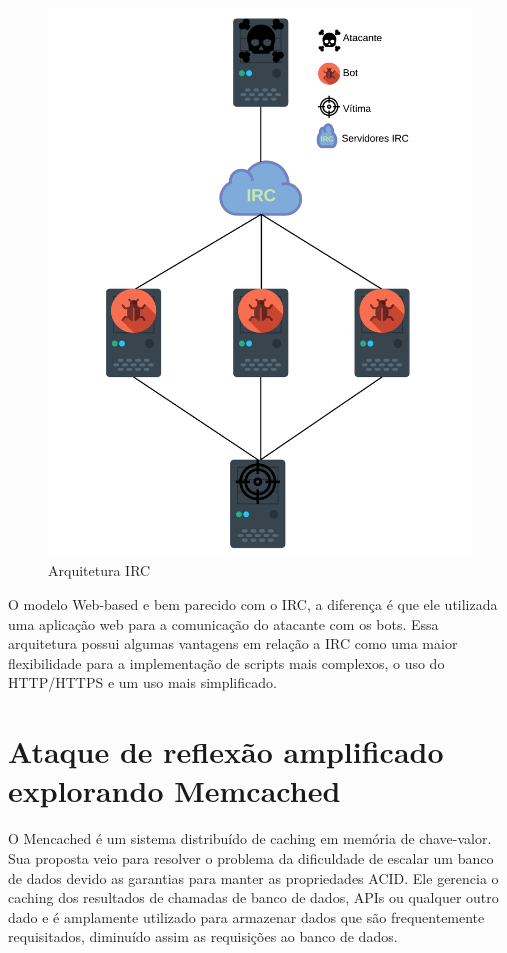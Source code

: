 \begin{figure}[H]
     \centering
     \includegraphics[scale=0.5]{img/DDoS_IRC.pdf}
     \caption{Arquitetura IRC }
     \label{img:DDoS_Architecture_IRC}
\end{figure}

O modelo Web-based e bem parecido com o IRC, a diferença é que ele utilizada uma aplicação web para a comunicação do atacante com os bots. Essa arquitetura possui algumas vantagens em relação a IRC como uma maior flexibilidade para a implementação de scripts mais complexos, o uso do HTTP/HTTPS e um uso mais simplificado.

\section{Ataque de reflexão amplificado explorando Memcached} \label{sec:2.Ataque de reflexão amplificado explorando Memcached}

O Mencached é um sistema distribuído de caching em memória de chave-valor. Sua proposta veio para resolver o problema da dificuldade de escalar um banco de dados devido as garantias para manter as propriedades \acrfull{ACID}. Ele gerencia o caching dos resultados de chamadas de banco de dados, APIs ou qualquer outro dado e é amplamente utilizado para armazenar dados que são frequentemente requisitados, diminuído assim as requisições ao banco de dados.


